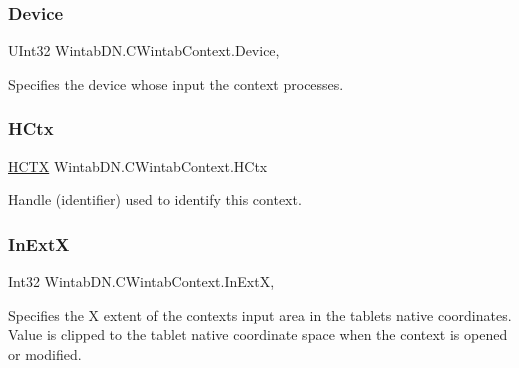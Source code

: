 \subsubsection{\texorpdfstring{Device}{Device}}
{\footnotesize\ttfamily U\+Int32 Wintab\+D\+N.\+C\+Wintab\+Context.\+Device\hspace{0.3cm}{\ttfamily [get]}, {\ttfamily [set]}}



Specifies the device whose input the context processes. 

\mbox{\label{class_wintab_d_n_1_1_c_wintab_context_ad4709db10fbf92aa19dcdf0c19c53415}} 
\subsubsection{\texorpdfstring{H\+Ctx}{HCtx}}
{\footnotesize\ttfamily \mbox{\hyperlink{class_wintab_d_n_1_1_h_c_t_x}{H\+C\+TX}} Wintab\+D\+N.\+C\+Wintab\+Context.\+H\+Ctx\hspace{0.3cm}{\ttfamily [get]}}



Handle (identifier) used to identify this context. 

\mbox{\label{class_wintab_d_n_1_1_c_wintab_context_a8f33e05910bcde9fe611f32a986a1ea5}} 
\subsubsection{\texorpdfstring{In\+ExtX}{InExtX}}
{\footnotesize\ttfamily Int32 Wintab\+D\+N.\+C\+Wintab\+Context.\+In\+ExtX\hspace{0.3cm}{\ttfamily [get]}, {\ttfamily [set]}}



Specifies the X extent of the context\textquotesingle{}s input area in the tablet\textquotesingle{}s native coordinates. Value is clipped to the tablet native coordinate space when the context is opened or modified. 

